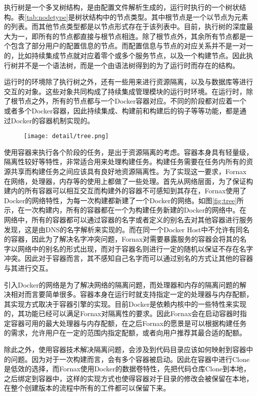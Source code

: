 执行树是一个多叉树结构，是由配置文件解析生成的，运行时执行的一个树状结构。表\ref{tab:nodetype}是树状结构中的节点类型。其中根节点是一个以节点为元素的列表。而其他节点类型都是以节点形式存在于该列表中。目前，执行树的深度最大为一，即所有的节点都直接与根节点相连。除了根节点外，其余所有节点都是一个包含了部分用户的配置信息的节点。而配置信息与节点的对应关系并不是一对一的，比如持续集成节点就对应着零个或多个服务节点，以及一个构建节点。因此执行树并不是一个语法树，而是一个由语法树得到的为了运行时而存在的结构。

运行时的环境除了执行树之外，还有一些用来进行资源隔离，以及与数据库等进行交互的对象。这些对象共同构成了持续集成管理模块的运行时环境。在运行时，除了根节点之外，所有的节点都与一个Docker容器对应。不同的阶段都对应着一个或者多个Docker容器，因此持续集成、构建前和构建后的钩子等等功能，都是通过Docker的容器机制实现的。

\begin{figure}[!htp]
  \centering
  \texttt{[image: detail/tree.png]}
\end{figure}

使用容器来执行各个阶段的任务，是出于资源隔离的考虑。容器本身具有轻量级，隔离性较好等特性，非常适合用来处理构建任务。构建任务需要在任务内所有的资源共享而构建任务之间应该具有良好地资源隔离性。为了实现这一要求，Fornax在网络，处理器，内存等的使用上都做了一些处理。首先从网络层面，为了保证构建内的所有容器可以相互交互而构建外的容器不可感知到其存在，Fornax使用了Docker的网络特性，为每一次构建都新建了一个Docker的网络。如图\ref{fig:tree}所示，在一次构建内，所有的容器都在一个为构建任务新建的Docker的网络中。在网络中，所有的容器都可以通过容器的名字或者定义的别名去对其他容器进行服务发现，这是由DNS的名字解析来实现的。而在同一个Docker Host中不允许有同名的容器，因此为了解决名字冲突问题，Fornax对需要暴露服务的容器会将其的名字以网络中的别名的形式出现，而对于容器名则进行一定的随机以保证不存在名字冲突。因此对于容器而言，其不感知自己名字而可以通过别名的方式让其他的容器与其进行交互。

引入Docker的网络是为了解决网络的隔离问题，而处理器和内存的隔离问题的解决相对而言要简单很多。容器本身在运行时就支持指定一定的处理器与内存配额，其实现方式取决于容器引擎的实现。目前Docker是依赖内核中的一些特性来实现的，其功能已经可以满足Fornax对隔离性的要求。因此Fornax会在启动容器时指定容器可用的最大处理器与内存配额，在之后Fornax的愿景是可以根据构建任务的需求，允许用户在一定的范围内指定配额，或者向用户推荐其最合适的配额。

除此之外，使用容器技术解决隔离问题，会涉及到代码目录应该如何映射到容器中的问题。因为对于一次构建而言，会有多个容器被启动。因此在容器中进行Clone是低效的选择，而Fornax使用Docker的数据卷特性，先把代码仓库Clone到本地，之后绑定到容器中，这样的实现方式也使得容器对于目录的修改会被保留在本地，在整个创建版本的流程中所有的工件都可以保留下来。

